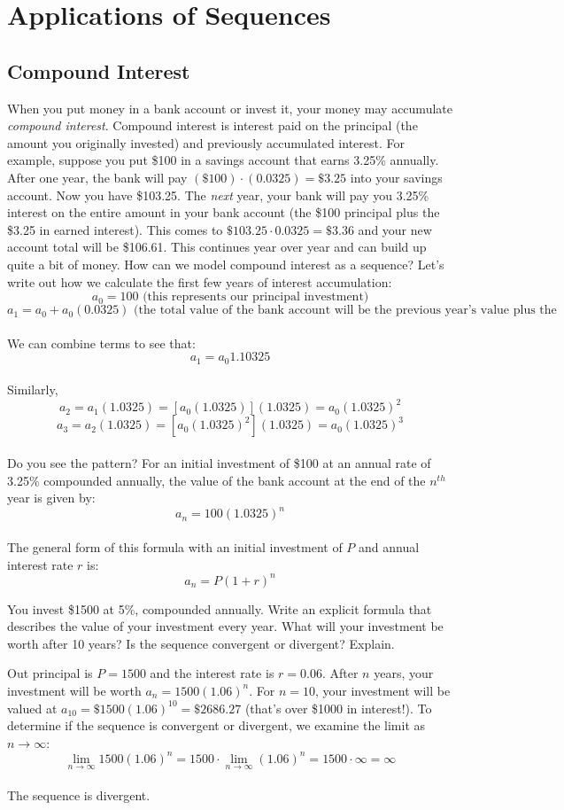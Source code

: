 \section{Applications of Sequences}
\subsection{Compound Interest}
When you put money in a bank account or invest it, your money may 
accumulate \textit{compound interest}. Compound interest is interest 
paid on the principal (the amount you originally invested) and 
previously accumulated interest. For example, suppose you put \$100 
in a savings account that earns 3.25\% annually. After one year, the 
bank will pay $(\$100)\cdot (0.0325) = \$3.25$ into your savings 
account. Now you have \$103.25. The \textit{next} year, your bank will 
pay you 3.25\% interest on the entire amount in your bank account 
(the \$100 principal plus the \$3.25 in earned interest). This comes 
to $\$103.25 \cdot 0.0325 = \$3.36$ and your new account total will be 
\$106.61. This continues year over year and can build up quite a bit 
of money. How can we model compound interest as a sequence? Let's 
write out how we calculate the first few years of interest 
accumulation:
$$a_0 = 100\text{ (this represents our principal investment)}$$
$$a_1 = a_0 + a_0(0.0325)\text{ (the total value of the bank account 
will be the previous year's value plus the interest)}$$\\
We can combine terms to see that:
$$a_1 = a_0{1.10325}$$\\
Similarly, 
$$a_2 = a_1(1.0325) = [a_0(1.0325)](1.0325) = a_0(1.0325)^2$$
$$a_3 = a_2(1.0325) = [a_0(1.0325)^2](1.0325) = a_0(1.0325)^3$$\\
Do you see the pattern? For an initial investment of \$100 at an 
annual rate of 3.25\% compounded annually, the value of the bank 
account at the end of the $n^{th}$ year is given by:
$$a_n = 100(1.0325)^{n}$$\\
The general form of this formula with an initial investment of $P$ 
and annual interest rate $r$ is:
$$a_n = P(1+r)^{n}$$

\begin{Exercise}[label=seqcalc5]
You invest \$1500 at 5\%, compounded annually. Write an explicit 
formula that describes the value of your investment every year. 
What will your investment be worth after 10 years? Is the sequence 
convergent or divergent? Explain. 
\end{Exercise}

\begin{Answer}[ref=seqcalc5]
Out principal is $P = 1500$ and the interest rate is $r = 0.06$. 
After $n$ years, your investment will be worth $a_n = 1500(1.06)^{n}$. 
For $n = 10$, your investment will be valued at $a_{10} = \$1500
(1.06)^{10} = \$2686.27$ (that's over \$1000 in interest!). To 
determine if the sequence is convergent or divergent, we examine the 
limit as $n \to \infty$:
$$\lim_{n \to \infty} 1500(1.06)^n = 1500\cdot \lim_{n \to \infty}
(1.06)^n = 1500 \cdot \infty = \infty$$\\
The sequence is divergent. 
\end{Answer}